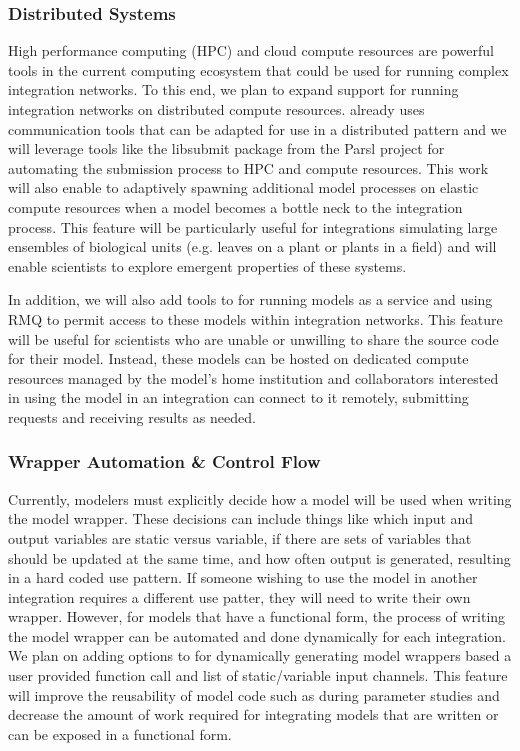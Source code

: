 \documentclass[journal]{IEEEtran}
\newcommand{\todo}[1]{{\color{red}{#1}}}
\newcommand{\pkg}{{\tt \todo{cis\_interface}}{}}
\begin{document}
\subsubsection{Distributed Systems}\label{SS:distributed}
%
High performance computing (HPC) and cloud compute resources are powerful tools in the current computing ecosystem that could be used for running complex integration networks. To this end, we plan to expand {\pkg} support for running integration networks on distributed compute resources. {\pkg} already uses communication tools that can be adapted for use in a distributed pattern \citep[ZMQ, RMQ][]{ZMQ, RMQ} and we will leverage tools like the libsubmit package from the Parsl project \citep{babuji18} for automating the submission process to HPC and compute resources. This work will also enable {\pkg} to adaptively spawning additional model processes on elastic compute resources when a model becomes a bottle neck to the integration process. This feature will be particularly useful for integrations simulating large ensembles of biological units (e.g. leaves on a plant or plants in a field) and will enable scientists to explore emergent properties of these systems.

In addition, we will also add tools to {\pkg} for running models as a service and using RMQ to permit access to these models within integration networks. This feature will be useful for scientists who are unable or unwilling to share the source code for their model. Instead, these models can be hosted on dedicated compute resources managed by the model's home institution and collaborators interested in using the model in an integration can connect to it remotely, submitting requests and receiving results as needed.

\subsubsection{Wrapper Automation \& Control Flow}\label{SS:control}
%
Currently, modelers must explicitly decide how a model will be used when writing the model wrapper. These decisions can include things like which input and output variables are static versus variable, if there are sets of variables that should be updated at the same time, and how often output is generated, resulting in a hard coded use pattern. If someone wishing to use the model in another integration requires a different use patter, they will need to write their own wrapper. However, for models that have a functional form, the process of writing the model wrapper can be automated and done dynamically for each integration. We plan on adding options to {\pkg} for dynamically generating model wrappers based a user provided function call and list of static/variable input channels. This feature will improve the reusability of model code such as during parameter studies and decrease the amount of work required for integrating models that are written or can be exposed in a functional form. 
\end{document}
